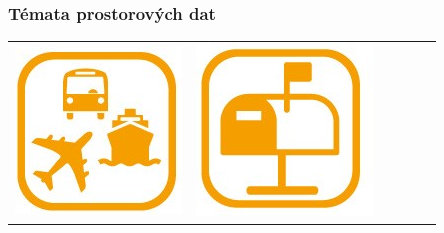 \begin{frame}
\frametitle{Témata prostorových dat}
\begin{center}
\begin{center}
\begin{tabular}{c c c c c c}
\includegraphics[scale=0.2]{obrazky/INSPIRE_Temata/TN.jpg} & \includegraphics[scale=0.2]{obrazky/INSPIRE_Temata/AD.jpg} &

\end{tabular}
\end{center}
\end{center}
\end{frame}
